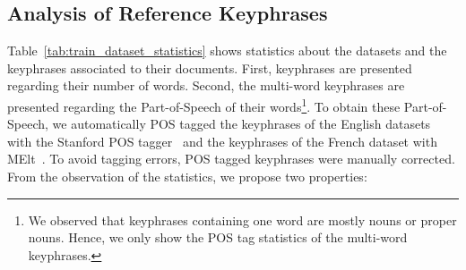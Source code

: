   \subsection{Analysis of Reference Keyphrases}
  \label{subsec:keyphrase_analysis}
    Table~\ref{tab:train_dataset_statistics} shows statistics about the datasets
    and the keyphrases associated to their documents. First, keyphrases are 
    presented regarding their number of words. Second, the multi-word keyphrases
    are presented regarding the Part-of-Speech of their words\footnote{We
    observed that keyphrases containing one word are mostly nouns or proper
    nouns. Hence, we only show the POS tag statistics of the multi-word
    keyphrases.}. To obtain these Part-of-Speech, we automatically POS tagged
    the keyphrases of the English datasets with the Stanford POS
    tagger~\cite{toutanova2003stanfordpostagger} and the keyphrases of the
    French dataset with MElt~\cite{denis2009melt}. To avoid tagging errors, POS
    tagged keyphrases were manually corrected.  From the observation of the
    statistics, we propose two properties:
